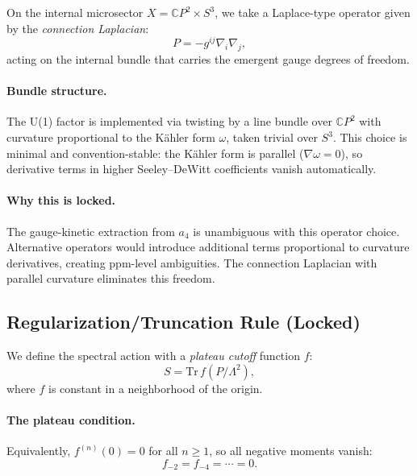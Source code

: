 On the internal microsector $X = \mathbb{C}P^2 \times S^3$, we take a Laplace-type operator given by the \emph{connection Laplacian}:
\begin{equation}\label{eq:connection-laplacian}
P = -g^{ij}\nabla_i\nabla_j,
\end{equation}
acting on the internal bundle that carries the emergent gauge degrees of freedom.

\paragraph{Bundle structure.}
The U(1) factor is implemented via twisting by a line bundle over $\mathbb{C}P^2$ with curvature proportional to the K\"ahler form $\omega$, taken trivial over $S^3$. This choice is minimal and convention-stable: the K\"ahler form is parallel ($\nabla\omega = 0$), so derivative terms in higher Seeley--DeWitt coefficients vanish automatically.

\paragraph{Why this is locked.}
The gauge-kinetic extraction from $a_4$ is unambiguous with this operator choice. Alternative operators would introduce additional terms proportional to curvature derivatives, creating ppm-level ambiguities. The connection Laplacian with parallel curvature eliminates this freedom.

\subsection{Regularization/Truncation Rule (Locked)}\label{sec:alpha-regularization}

We define the spectral action with a \emph{plateau cutoff} function $f$:
\begin{equation}\label{eq:spectral-action-plateau}
S = \mathrm{Tr}\, f(P/\Lambda^2),
\end{equation}
where $f$ is constant in a neighborhood of the origin.

\paragraph{The plateau condition.}
Equivalently, $f^{(n)}(0) = 0$ for all $n \geq 1$, so all negative moments vanish:
\begin{equation}
f_{-2} = f_{-4} = \cdots = 0.
\end{equation}

